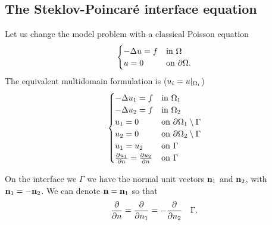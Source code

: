 \subsection{The Steklov-Poincaré interface equation}
Let us change the model problem with a classical Poisson equation 
\begin{equation}
    \begin{cases}
        -\Delta u = f & \text{in }\Omega \\
        u = 0 & \text{on }{\partial\Omega}.
    \end{cases}
    \label{model_problem_poisson_dd}
\end{equation}
The equivalent multidomain formulation is (\(u_i = u\vert_{\Omega_i}\))
\begin{equation}
    \begin{cases}
        -\Delta u_1 = f & \txt{in }\Omega_1 \\
        -\Delta u_2 = f & \txt{in }\Omega_2 \\
        u_1 = 0 & \txt{on }\boundary_1\setminus\Gamma \\
        u_2 = 0 & \txt{on } \boundary_2\setminus\Gamma\\
        u_1 = u_2 & \txt{on }\Gamma \\
        \partialderivative{u_1}{n} = \partialderivative{u_2}{n} & \txt{on }\Gamma
    \end{cases}
    \label{multi_domain_poisson_dd}
\end{equation}
\begin{remark}
    On the interface we \(\Gamma\) we have the normal unit vectors \(\textbf{n}_1\) and \(\textbf{n}_2\), with \(\textbf{n}_1 = -\textbf{n}_2\). We can denote \(\textbf{n} =  \textbf{n}_1\) so that 
    \[
        \pderivative{n} = \pderivative{n_1} = -\pderivative{n_2} \quad \Gamma.
    \]
\end{remark}
